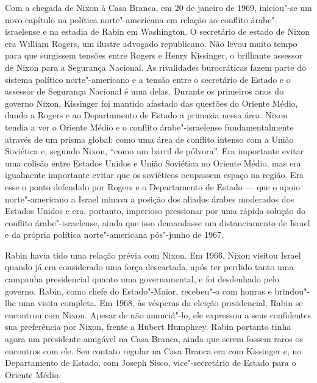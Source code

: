 Com a chegada de Nixon à Casa Branca, em 20 de janeiro de 1969, iniciou"-se
um novo capítulo na política norte"-americana em relação ao conflito
árabe"-israelense e na estadia de Rabin em Washington. O secretário de
estado de Nixon era William Rogers, um ilustre advogado republicano. Não
levou muito tempo para que surgissem tensões entre Rogers e Henry
Kissinger, o brilhante assessor de Nixon para a Segurança Nacional. As
rivalidades burocráticas fazem parte do sistema político norte"-americano
e a tensão entre o secretário de Estado e o assessor de Segurança
Nacional é uma delas. Durante os primeiros anos do governo Nixon,
Kissinger foi mantido afastado das questões do Oriente Médio, dando a
Rogers e ao Departamento de Estado a primazia nessa área. Nixon tendia a
ver o Oriente Médio e o conflito árabe"-israelense fundamentalmente
através de um prisma global: como uma área de conflito intenso com a
União Soviética e, segundo Nixon, ``como um barril de pólvora''. Era
importante evitar uma colisão entre Estados Unidos e União Soviética no
Oriente Médio, mas era igualmente importante evitar que os soviéticos
ocupassem espaço na região. Era esse o ponto defendido por
Rogers e o Departamento de Estado --- que o apoio norte"-americano a
Israel minava a posição dos aliados árabes moderados dos Estados Unidos
e era, portanto, imperioso pressionar por uma rápida solução do conflito
árabe"-israelense, ainda que isso demandasse um distanciamento de Israel e
da própria política norte"-americana pós"-junho de 1967.


Rabin havia tido uma relação prévia com Nixon. Em 1966, Nixon visitou
Israel quando já era considerado uma força descartada, após ter perdido
tanto uma campanha presidencial quanto uma governamental, e foi
desdenhado pelo governo. Rabin, como chefe do Estado"-Maior, recebeu"-o com
honras e brindou"-lhe uma visita completa. Em 1968, às vésperas da
eleição presidencial, Rabin se encontrou com Nixon. Apesar de não
anunciá"-lo, ele expressou a seus confidentes sua preferência por
Nixon, frente a Hubert Humphrey. Rabin portanto tinha agora um
presidente amigável na Casa Branca, ainda que serem fossem raros os
encontros com ele. Seu contato regular na Casa Branca era com Kissinger
e, no Departamento de Estado, com Joseph Sisco, vice"-secretário de
Estado para o Oriente Médio.

